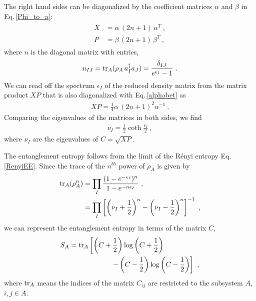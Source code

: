 The right hand sides can be diagonalized by the coefficient matrices $\alpha$ and $\beta$ in Eq.\,\eqref{Phi_to_a}:
\begin{align}\label{XPDeqs}
\begin{aligned}
X &= \alpha\, (2n+1)\, \alpha^T \ , \\
P &= \beta\, (2n+1)\, \beta^T \ ,
\end{aligned}
\end{align}
where $n$ is the diagonal matrix with entries,
\begin{align}
n_{IJ} = {\rm tr}_A (\rho_A\, a_I^\dagger a_J ) = \frac{\delta_{IJ}}{e^{\epsilon_I} - 1} \ .
\end{align}
We can read off the spectrum $\epsilon_I$ of the reduced density matrix from the matrix product $XP$ that is also diagonalized with Eq.\,\eqref{alphabet} as
\begin{align}
XP = \frac{1}{4} \alpha\, (2n+1)^2 \alpha^{-1} \ .
\end{align}
Comparing the eigenvalues of the matrices in both sides, we find
\begin{align}\label{EigenRel1}
\nu_I = \frac{1}{2}\coth \frac{\epsilon_I}{2} \ ,
\end{align}
where $\nu_I$ are the eigenvalues of $C=\sqrt{XP}$.


The entanglement entropy follows from the limit of the R{\'e}nyi entropy Eq.\,\eqref{RenyiEE}.
Since the trace of the $n^{th}$ power of $\rho_A$ is given by
\begin{align}
\begin{aligned}
{\rm tr}_A( \rho_A^n) &= \prod_{I}\frac{(1- e^{-\epsilon_I})^n}{1- e^{-n \epsilon_I}} \ ,\\
	&= \prod_{I}\left[ \left(\nu_I + \frac{1}{2}\right)^n - \left(\nu_I - \frac{1}{2}\right)^n \right]^{-1} \ ,
\end{aligned}
\end{align}
we can represent the entanglement entropy in terms of the matrix $C$,
\begin{align}\label{EE_Lattice}
\begin{aligned}
S_A &= {\rm tr}_A \left[ \left( C + \frac{1}{2}\right) \log\left( C + \frac{1}{2}\right)\right. \\
		&\qquad \qquad \qquad \left.- \left( C - \frac{1}{2}\right) \log\left( C - \frac{1}{2}\right)\right] \ ,
\end{aligned}
\end{align}
where ${\rm tr}_A$ means the indices of the matrix $C_{ij}$ are restricted to the subsystem $A$, $i,j\in A$.

